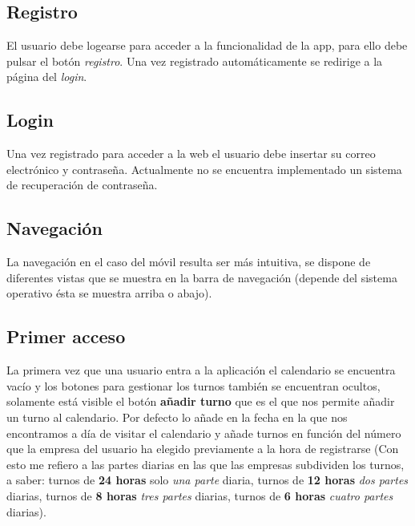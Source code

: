 

\subsection{Registro}

El usuario debe logearse para acceder a la  funcionalidad de la app, para ello debe pulsar el botón \emph{registro}. Una vez registrado automáticamente se redirige a la página del \emph{login}.


\subsection{Login}

Una vez registrado para acceder a la web el usuario debe insertar su correo electrónico y contraseña. Actualmente no se encuentra implementado un sistema de recuperación de contraseña.



\subsection{Navegación}

La navegación en el caso del móvil resulta ser más intuitiva, se dispone de diferentes vistas que se muestra en la barra de navegación (depende del sistema operativo ésta se muestra arriba o abajo).






\subsection{Primer acceso}
La primera vez que una usuario entra a la aplicación el calendario se encuentra vacío y los botones para gestionar los turnos también se encuentran ocultos, solamente está visible el botón \textbf{añadir turno} que es el que nos permite añadir un turno al calendario. Por defecto lo añade en la fecha en la que nos encontramos a día de visitar el calendario y añade turnos en función del número que la empresa del usuario ha elegido previamente a la hora de registrarse (Con esto me refiero a las partes diarias en las que las empresas subdividen los turnos, a saber: turnos de \textbf{ 24 horas} solo \emph{una parte} diaria, turnos de \textbf{12 horas} \emph{dos partes} diarias, turnos de \textbf{8 horas} \emph{tres partes} diarias, turnos de \textbf{6 horas}  \emph{cuatro partes} diarias).

